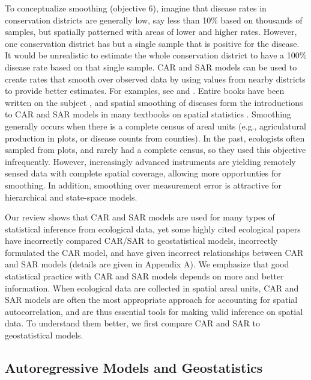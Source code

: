 \documentclass[11pt, titlepage]{article}\usepackage[]{graphicx}\usepackage[]{color}
\begin{document}
\begin{spacing}{1.9}
\begin{flushleft}
To conceptualize smoothing (objective 6), imagine that disease rates in conservation districts are generally low, say less than 10\% based on thousands of samples, but spatially patterned with areas of lower and higher rates.  However, one conservation district has but a single sample that is positive for the disease.  It would be unrealistic to estimate the whole conservation district to have a 100\% disease rate based on that single sample. CAR and SAR models can be used to create rates that smooth over observed data by using values from nearby districts to provide better estimates. For examples, see \citet{Begu:Mart:Rue:Cumm:hier:2012} and \citet{Evan:Kirc:Eyle:Ryan:Walt:habi:2016}. Entire books have been written on the subject \citep[e.g.,][]{Elli:Wake:Best:Brig:2000,Pfei:Robi:Stev:Stev:Roge:spat:2008,Laws:stat:2013}, and spatial smoothing of diseases form the introductions to CAR and SAR models in many textbooks on spatial statistics \citep{Cres:stat:1993,Wall:Gotw:appl:2004, Scha:Gotw:stat:2005, Bane:Carl:Gelf:hier:2014}.  Smoothing generally occurs when there is a complete census of areal units (e.g., agriculatural production in plots, or disease counts from counties). In the past, ecologists often sampled from plots, and rarely had a complete census, so they used this objective infrequently. However, increasingly advanced instruments \citep[e.g., LIDAR, ][]{Camp:Wynn:intr:2011} are yielding remotely sensed data with complete spatial coverage, allowing more opportunties for smoothing.  In addition, smoothing over measurement error is attractive for hierarchical \citep{Cres:Cald:Clar:VerH:acco:2009} and state-space \citep{deVa:Hast:fitt:2002} models.

Our review shows that CAR and SAR models are used for many types of statistical inference from ecological data, yet some highly cited ecological papers have incorrectly compared CAR/SAR to geostatistical models, incorrectly formulated the CAR model, and have given incorrect relationships between CAR and SAR models (details are given in Appendix A). We emphasize that good statistical practice with CAR and SAR models depends on more and better information.  When ecological data are collected in spatial areal units, CAR and SAR models are often the most appropriate approach for accounting for spatial autocorrelation, and are thus essential tools for making valid inference on spatial data.   To understand them better, we first compare CAR and SAR to geostatistical models.

\subsection*{Autoregressive Models and Geostatistics}


\end{flushleft}
\end{spacing}
\end{document}
